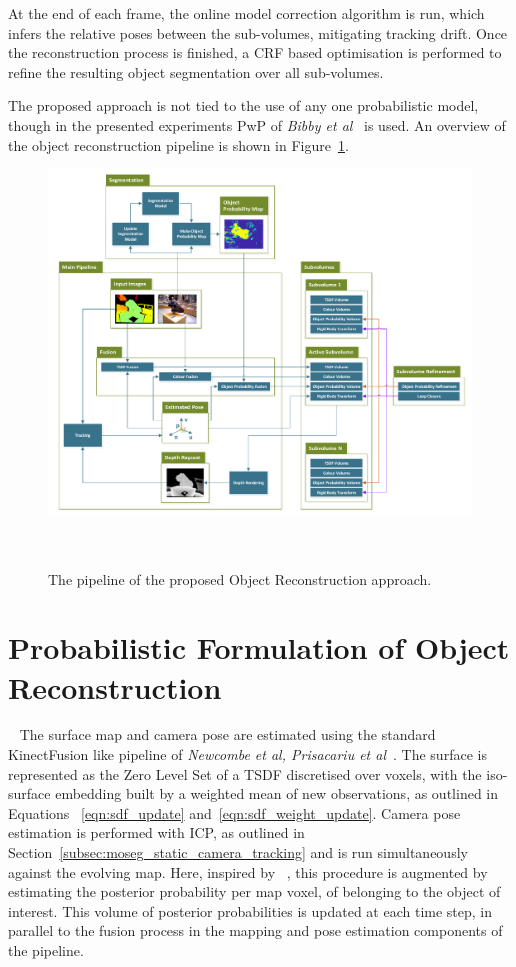 At the end of each frame, the online model correction algorithm is run, which
infers the relative poses between the sub-volumes, mitigating tracking drift.
Once the reconstruction process is finished, a CRF based optimisation is 
performed to refine the resulting object segmentation over all sub-volumes.

The proposed approach is not tied to the use of any one probabilistic model,
though in the presented experiments PwP of \textit{Bibby et al}~\cite{Bibby2008} is used. 
An overview of the object reconstruction pipeline is shown in Figure~\ref{figure:probobj_pipeline_diagram}.
\begin{figure}[!htbp]
  \centering
  \includegraphics[width=\linewidth]{figures/object_recon/pipeline.pdf}
  \caption[Probabilistic Object Reconstruction Pipeline]
  {The pipeline of the proposed Object Reconstruction approach.}
~\label{figure:probobj_pipeline_diagram}
\end{figure}

\section{Probabilistic Formulation of Object Reconstruction}
~\label{sec:probobj_prob_formulation}
The surface map and camera pose are estimated using the standard KinectFusion
like pipeline of \textit{Newcombe et al, Prisacariu et al}~\cite{Newcombe2011,Prisacariu2014}. 
The surface is represented as the Zero Level Set of a TSDF discretised over voxels, with the 
iso-surface embedding built by a weighted mean of new observations, as outlined in Equations
~\ref{eqn:sdf_update} and~\ref{eqn:sdf_weight_update}. Camera pose estimation is
performed with ICP, as outlined in Section~\ref{subsec:moseg_static_camera_tracking} 
and is run simultaneously against the evolving map. Here, inspired by 
~\cite{Kolev2006}, this procedure is augmented by estimating the posterior probability 
per map voxel, of belonging to the object of interest. This volume of posterior 
probabilities is updated at each time step, in parallel to the fusion process in the 
mapping and pose estimation components of the pipeline. 

